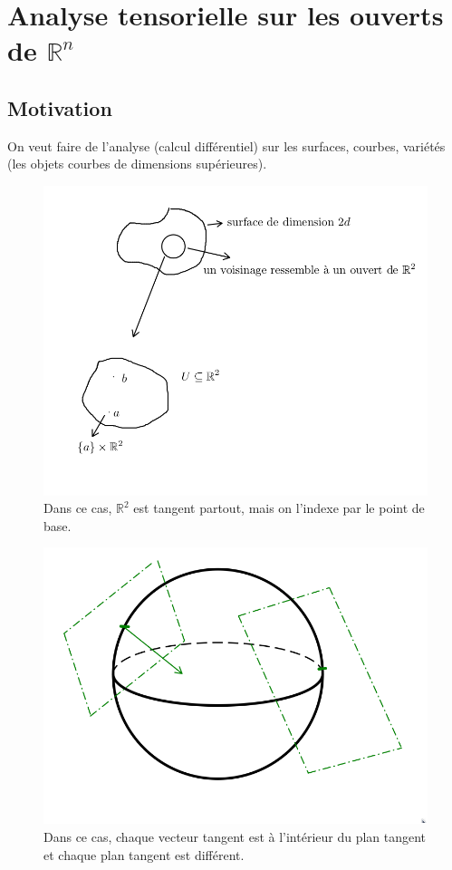 \documentclass[french]{article}
\theoremstyle{definition}
\begin{document}
\section{Analyse tensorielle sur les ouverts de \(\mathbb{R}^n\)}

\subsection{Motivation}

On veut faire  de l'analyse (calcul différentiel) sur les surfaces, courbes, variétés (les objets courbes de dimensions supérieures).


\begin{figure}[h!]
  \centering
  \includegraphics[scale=0.3]{figures/motiv1.png}
  \caption{Dans ce cas, \(\mathbb{R}^2\) est tangent partout, mais on l'indexe par le point de base. }
  \label{}
\end{figure}

\begin{figure}[h!]
  \centering
  \includegraphics[scale=0.2]{figures/motiv2.png}
  \caption{Dans ce cas, chaque vecteur tangent est à l'intérieur du plan tangent et chaque plan tangent est différent.}
  \label{}
\end{figure}
\end{document}
